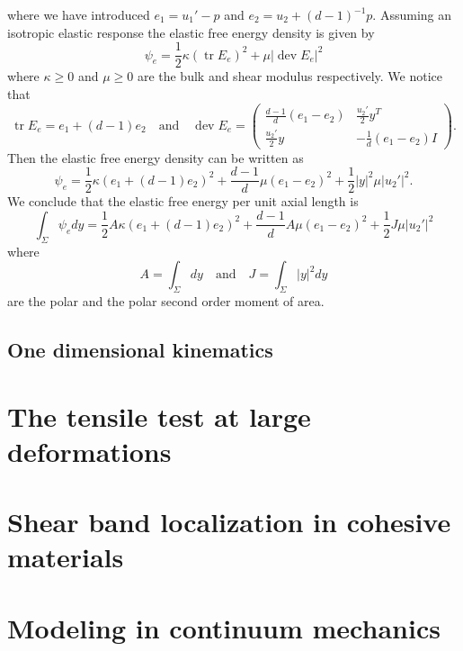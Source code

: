 \documentclass[letterpaper,oneside]{amsart}
\numberwithin{equation}{section}
\theoremstyle{definition}
\DeclareMathOperator{\dev}{dev}
\DeclareMathOperator{\tr}{tr}
\begin{document}
where we have introduced $e_1=u_1'-p$ and $e_2=u_2+(d-1)^{-1}p$. Assuming an isotropic elastic response the elastic free energy density is given by
\begin{equation*}
\psi_e=\frac{1}{2}\kappa(\tr E_e)^2+\mu|\dev E_e|^2
\end{equation*}
where $\kappa\ge0$ and $\mu\ge0$ are the bulk and shear modulus respectively. We notice that
\begin{equation*}
\tr E_e=e_1+(d-1)e_2\quad\text{and}\quad\dev E_e=\begin{pmatrix}
\frac{d-1}{d}(e_1-e_2) & \frac{u_2'}{2}y^T \\
\frac{u_2'}{2}y & -\frac{1}{d}(e_1-e_2)I
\end{pmatrix}.
\end{equation*}
Then the elastic free energy density can be written as
\begin{equation*}
\psi_e=\frac{1}{2}\kappa\left(e_1+(d-1)e_2\right)^2+\frac{d-1}{d}\mu(e_1-e_2)^2+\frac{1}{2}|y|^2\mu|u_2'|^2.
\end{equation*}
We conclude that the elastic free energy per unit axial length is
\begin{equation*}
\int_\Sigma\psi_edy=\frac{1}{2}A\kappa\left(e_1+(d-1)e_2\right)^2+\frac{d-1}{d}A\mu(e_1-e_2)^2+\frac{1}{2}J\mu|u_2'|^2
\end{equation*}
where
\begin{equation*}
A=\int_\Sigma dy\quad\text{and}\quad J=\int_\Sigma|y|^2dy
\end{equation*}
are the polar and the polar second order moment of area.

\subsection{One dimensional kinematics}



\section{The tensile test at large deformations}

\section{Shear band localization in cohesive materials}

\appendix

\section{Modeling in continuum mechanics}
\end{document}
